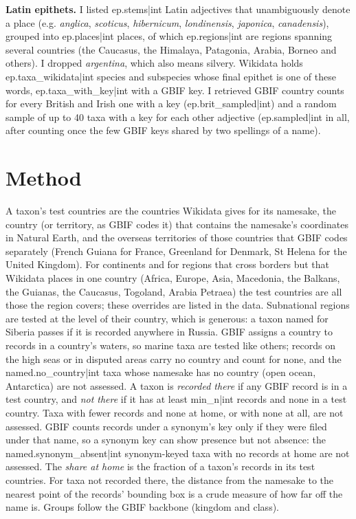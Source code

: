 \documentclass[11pt,a4paper]{article}
\begin{document}
\textbf{Latin epithets.} I listed {{ep.stems|int}} Latin adjectives that unambiguously denote a place (e.g. \textit{anglica}, \textit{scoticus}, \textit{hibernicum}, \textit{londinensis}, \textit{japonica}, \textit{canadensis}), grouped into {{ep.places|int}} places, of which {{ep.regions|int}} are regions spanning several countries (the Caucasus, the Himalaya, Patagonia, Arabia, Borneo and others). I dropped \textit{argentina}, which also means silvery. Wikidata holds {{ep.taxa_wikidata|int}} species and subspecies whose final epithet is one of these words, {{ep.taxa_with_key|int}} with a GBIF key. I retrieved GBIF country counts for every British and Irish one with a key ({{ep.brit_sampled|int}}) and a random sample of up to 40 taxa with a key for each other adjective ({{ep.sampled|int}} in all, after counting once the few GBIF keys shared by two spellings of a name).

\section{Method}
A taxon's test countries are the countries Wikidata gives for its namesake, the country (or territory, as GBIF codes it) that contains the namesake's coordinates in Natural Earth, and the overseas territories of those countries that GBIF codes separately (French Guiana for France, Greenland for Denmark, St Helena for the United Kingdom). For continents and for regions that cross borders but that Wikidata places in one country (Africa, Europe, Asia, Macedonia, the Balkans, the Guianas, the Caucasus, Togoland, Arabia Petraea) the test countries are all those the region covers; these overrides are listed in the data. Subnational regions are tested at the level of their country, which is generous: a taxon named for Siberia passes if it is recorded anywhere in Russia. GBIF assigns a country to records in a country's waters, so marine taxa are tested like others; records on the high seas or in disputed areas carry no country and count for none, and the {{named.no_country|int}} taxa whose namesake has no country (open ocean, Antarctica) are not assessed. A taxon is \emph{recorded there} if any GBIF record is in a test country, and \emph{not there} if it has at least {{min_n|int}} records and none in a test country. Taxa with fewer records and none at home, or with none at all, are not assessed. GBIF counts records under a synonym's key only if they were filed under that name, so a synonym key can show presence but not absence: the {{named.synonym_absent|int}} synonym-keyed taxa with no records at home are not assessed. The \emph{share at home} is the fraction of a taxon's records in its test countries. For taxa not recorded there, the distance from the namesake to the nearest point of the records' bounding box is a crude measure of how far off the name is. Groups follow the GBIF backbone (kingdom and class).
\end{document}
